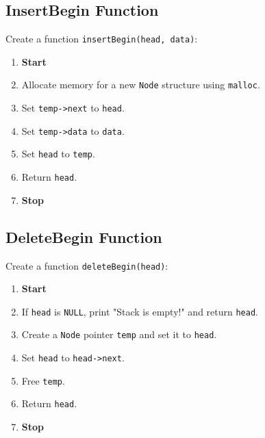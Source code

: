 {  \subsection{InsertBegin Function}
  Create a function \texttt{insertBegin(head, data)}:
  \begin{enumerate}[label=\arabic*:,left=0pt]
    \item \textbf{Start}
    \item Allocate memory for a new \texttt{Node} structure using \texttt{malloc}.
    \item Set \texttt{temp->next} to \texttt{head}.
    \item Set \texttt{temp->data} to \texttt{data}.
    \item Set \texttt{head} to \texttt{temp}.
    \item Return \texttt{head}.
    \item \textbf{Stop}
  \end{enumerate}

  \subsection{DeleteBegin Function}
  Create a function \texttt{deleteBegin(head)}:
  \begin{enumerate}[label=\arabic*:,left=0pt]
    \item \textbf{Start}
    \item If \texttt{head} is \texttt{NULL}, print "Stack is empty!" and return \texttt{head}.
    \item Create a \texttt{Node} pointer \texttt{temp} and set it to \texttt{head}.
    \item Set \texttt{head} to \texttt{head->next}.
    \item Free \texttt{temp}.
    \item Return \texttt{head}.
    \item \textbf{Stop}
  \end{enumerate}

}
